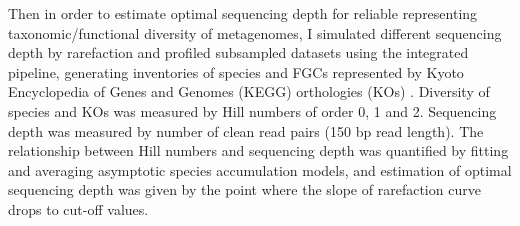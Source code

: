\documentclass[11pt]{article}
\begin{document}
  Then in order to estimate optimal sequencing depth for reliable representing taxonomic/functional diversity of metagenomes, I simulated different sequencing depth by rarefaction and profiled subsampled datasets using the integrated pipeline, generating inventories of species and FGCs represented by Kyoto Encyclopedia of Genes and Genomes (KEGG) orthologies (KOs) \citep{kanehisa2000kegg}. 
  Diversity of species and KOs was measured by Hill numbers of order 0, 1 and 2. 
  Sequencing depth was measured by number of clean read pairs (150 bp read length). 
  The relationship between Hill numbers and sequencing depth was quantified by fitting and averaging asymptotic species accumulation models, and estimation of optimal sequencing depth was given by the point where the slope of rarefaction curve drops to cut-off values. 
  
\end{document}
